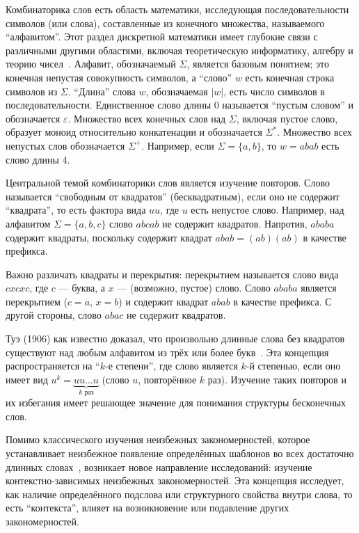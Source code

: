 \documentclass[a4paper,14pt]{extreport}
\theoremstyle{plain}
\theoremstyle{definition}
\theoremstyle{remark}
\begin{document}
Комбинаторика слов есть область математики, исследующая последовательности символов (или слова), составленные из конечного множества, называемого ``алфавитом''. Этот раздел дискретной математики имеет глубокие связи с различными другими областями, включая теоретическую информатику, алгебру и теорию чисел~\cite{Berstel}. Алфавит, обозначаемый $\Sigma$, является базовым понятием; это конечная непустая совокупность символов, а ``слово'' $w$ есть конечная строка символов из $\Sigma$. ``Длина'' слова $w$, обозначаемая $|w|$, есть число символов в последовательности. Единственное слово длины 0 называется ``пустым словом'' и обозначается $\varepsilon$. Множество всех конечных слов над $\Sigma$, включая пустое слово, образует моноид относительно конкатенации и обозначается $\Sigma^*$. Множество всех непустых слов обозначается $\Sigma^+$. Например, если $\Sigma = \{a, b\}$, то $w = abab$ есть слово длины 4.

Центральной темой комбинаторики слов является изучение повторов. Слово называется ``свободным от квадратов'' (бесквадратным), если оно не содержит ``квадрата'', то есть фактора вида $uu$, где $u$ есть непустое слово. Например, над алфавитом $\Sigma = \{a, b, c\}$ слово $abcab$ не содержит квадратов. Напротив, $ababa$ содержит квадраты, поскольку содержит квадрат $abab = (ab)(ab)$ в качестве префикса. 

Важно различать квадраты и перекрытия: перекрытием называется слово вида $cxcxc$, где $c$ --- буква, а $x$ --- (возможно, пустое) слово. Слово $ababa$ является перекрытием ($c=a$, $x=b$) и содержит квадрат $abab$ в качестве префикса. С другой стороны, слово $abac$ не содержит квадратов.

Туэ (1906) как известно доказал, что произвольно длинные слова без квадратов существуют над любым алфавитом из трёх или более букв~\cite{Thue}. Эта концепция распространяется на ``$k$-е степени'', где слово является $k$-й степенью, если оно имеет вид $u^k = \underbrace{uu\dots u}_{k \text{ раз}}$ (слово $u$, повторённое $k$ раз). Изучение таких повторов и их избегания имеет решающее значение для понимания структуры бесконечных слов.

Помимо классического изучения неизбежных закономерностей, которое устанавливает неизбежное появление определённых шаблонов во всех достаточно длинных словах~\cite{Berstel}, возникает новое направление исследований: изучение контекстно-зависимых неизбежных закономерностей. Эта концепция исследует, как наличие определённого подслова или структурного свойства внутри слова, то есть ``контекста'', влияет на возникновение или подавление других закономерностей.
\end{document}
